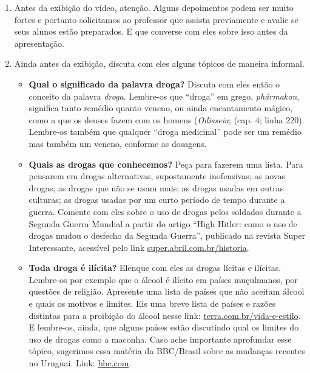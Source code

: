 \documentclass[12pt]{extarticle}
\begin{document}
	\begin{enumerate}
		\item Antes da exibição do vídeo, atenção. Alguns depoimentos podem ser muito fortes e portanto solicitamos 
		ao professor que assista previamente e avalie se seus alunos 
		estão preparados. E que converse com eles sobre isso antes da apresentação.
		\item Ainda antes da exibição, discuta com eles alguns tópicos de
		maneira informal. 

		\begin{itemize}
			\item \textbf{Qual o significado da palavra droga?} Discuta com eles então o conceito da 
			palavra \emph{droga}. Lembre-os que ``droga'' 
			em grego, \textit{phármakon}, significa tanto remédio quanto veneno, ou ainda 
			encantamento mágico, como a que os deuses fazem com os homens (\textit{Odisseia}; 
			(cap. 4; linha 220). 
			Lembre-os também que qualquer ``droga 
			medicinal'' pode ser um remédio mas também um veneno, conforme as dosagens. 

			\item \textbf{Quais as drogas que conhecemos?} Peça para fazerem uma lista. Para 
			pensarem em drogas alternativas, supostamente inofensivas; as novas drogas; 
			as drogas que não se usam mais; as drogas usadas em outras culturas; as drogas usadas
			por um curto período de tempo durante a guerra. Comente com eles sobre o 
			uso de drogas pelos soldados durante a Segunda Guerra Mundial a partir do 
			artigo ``High Hitler: como o uso de drogas mudou o desfecho da Segunda Guerra'', 
			publicado na revista Super Interessante, acessível pelo link 
			\href{https://super.abril.com.br/historia/high-hitler-como-o-uso-de-drogas-mudou-o-desfecho-da-2a-guerra/}{super.abril.com.br/historia}.

			\item \textbf{Toda droga é ilícita?} Elenque com eles as drogas lícitas e ilícitas. Lembre-os 
			por exemplo que o álcool é ilícito em países muçulmanos, por questões de religião. 
			Apresente uma lista de países que não aceitam álcool e quais os motivos e limites. 
			Eis uma breve lista de países e razões distintas para a proibição do álcool 
			nesse link: \href{https://www.terra.com.br/vida-e-estilo/turismo/internacional/jornal-lista-10-paises-onde-bebida-alcoolica-e-proibida,a1aebf5da7afe310VgnVCM5000009ccceb0aRCRD.html}{terra.com.br/vida-e-estilo}. 
			E lembre-os, ainda, que alguns países estão discutindo 
			qual os limites do uso de drogas como a maconha. Caso ache importante 
			aprofundar esse tópico, sugerimos essa matéria da BBC/Brasil sobre 
			as mudanças recentes no Uruguai. Link: 
			\href{https://www.bbc.com/portuguese/internacional-50842940}{bbc.com}.


\end{itemize}
\end{enumerate}
\end{document}
